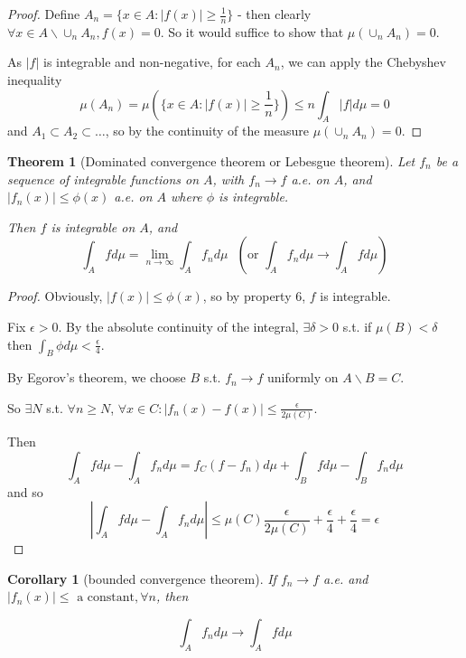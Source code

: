 \documentclass[11pt,a4paper]{report}
\newtheorem{corollary}[theorem]{Corollary}
\theoremstyle{plain}
\newtheorem{thm}{Theorem}[section]
\theoremstyle{definition}
\theoremstyle{remark}
\newcommand{\union}{\cup}
\newcommand{\abs}[1]{\left| #1 \right|}
\begin{document}
\begin{proof}
    Define $A_n = \{ x \in A : \abs{f(x)} \ge \frac{1}{n} \}$ - then clearly $\forall x \in A \backslash \union_n A_n, f(x) = 0$. So it would suffice to show that $\mu(\union_n A_n) = 0$. 
    
    As $\abs{f}$ is integrable and non-negative, for each $A_n$, we can apply the Chebyshev inequality
    $$ \mu(A_n) = \mu(\{x \in A : \abs{f(x)} \ge \frac{1}{n}\}) \le n \int_A \abs{f}d\mu = 0 $$
    and $A_1 \subset A_2 \subset \dots$, so by the continuity of the measure $\mu(\union_n A_n) = 0$.
\end{proof}

\begin{thm}[Dominated convergence theorem or Lebesgue theorem]
    Let $f_n$ be a sequence of integrable functions on $A$, with $f_n \rightarrow f$ a.e. on $A$, and $\abs{f_n(x)} \le \phi(x)$ a.e. on $A$ where $\phi$ is integrable.

    Then $f$ is integrable on $A$, and 
    $$\int_A f d\mu = \lim_{n \rightarrow \infty} \int_A f_n d\mu \text{ } \left(\text{or $\int_A f_n d\mu \rightarrow \int_A f d\mu$} \right)$$
\end{thm}

\begin{proof}
    Obviously, $\abs{f(x)} \le \phi(x)$, so by property 6, $f$ is integrable.

    Fix $\epsilon > 0$. By the absolute continuity of the integral, $\exists \delta > 0$ s.t. if $\mu(B) < \delta$ then $\int_B \phi d\mu < \frac{\epsilon}{4}$.

    By Egorov's theorem, we choose $B$ s.t. $f_n \rightarrow f$ uniformly on $A \backslash B = C$.

    So $\exists N$ s.t. $\forall n \ge N$, $\forall x \in C: \abs{f_n(x) - f(x)} \le \frac{\epsilon}{2\mu(C)}$.

    Then 
    $$ \int_A f d\mu - \int_A f_n d\mu = f_C (f - f_n) d\mu + \int_B f d\mu - \int_B f_n d\mu$$
    and so
    $$ \abs{\int_A f d\mu - \int_A f_n d\mu} \le \mu(C)\frac{\epsilon}{2\mu(C)} + \frac{\epsilon}{4} + \frac{\epsilon}{4} = \epsilon $$
\end{proof}


\begin{corollary}[bounded convergence theorem]

    If $f_n \rightarrow f$ a.e. and $\abs{f_n(x)} \le \text{ a constant}, \forall n$, then

    $$ \int_A f_n d\mu \rightarrow \int_A f d\mu $$
\end{corollary}
\end{document}
